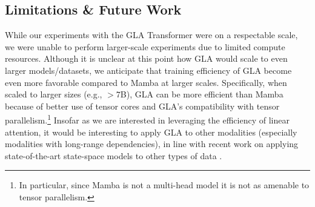 \subsection{Limitations \& Future Work}
\vspace{-2mm}
While our experiments with the GLA Transformer were on a respectable scale, we were unable to perform larger-scale experiments due to limited compute resources.
Although it is unclear at this point how GLA would scale to even larger models/datasets, we anticipate that training efficiency of GLA become even more favorable compared to Mamba at larger scales. Specifically, when scaled to larger sizes (e.g., $>7$B), GLA can be more efficient than Mamba because of better use of tensor cores and GLA's compatibility with tensor parallelism.\footnote{In particular, since Mamba is not a  multi-head model it is not as amenable to tensor parallelism.} Insofar as we are interested in leveraging the efficiency of linear attention, it would be interesting to apply GLA to other modalities (especially modalities with long-range dependencies), in line with recent work on applying state-of-the-art state-space models to other types of data \citep[][\textit{inter alia}]{Yan2023DiffusionMW, zhu2024vision,ma2024u,liu2024vmamba,xing2024segmamba,wang2024graph,wang2024mambabyte,yang2024vivim}.

